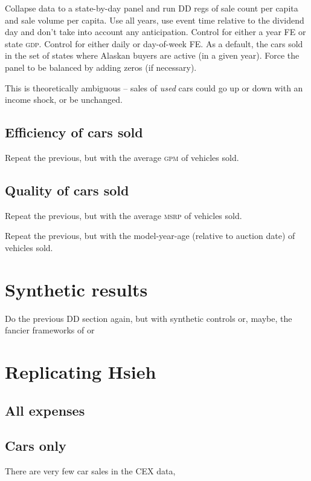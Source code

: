 \documentclass[11pt,letterpaper,oneside]{article}
\newcommand{\gpm}{\textsc{gpm}}
\newcommand{\msrp}{\textsc{msrp}}
\newcommand{\gdp}{\textsc{gdp}}
\begin{document}
Collapse data to a state-by-day panel and run DD regs of sale count per capita and sale volume per capita.
Use all years, use event time relative to the dividend day and don't take into account any anticipation.
Control for either a year FE or state \gdp{}. Control for either daily or day-of-week FE.
As a default, the cars sold in the set of states where Alaskan buyers are active (in a given year).
Force the panel to be balanced by adding zeros (if necessary).

This is theoretically ambiguous -- sales of \emph{used} cars could go up or down with an income shock, or be unchanged.

\subsection{Efficiency of cars sold}
Repeat the previous, but with the average \gpm{} of vehicles sold.

\subsection{Quality of cars sold}
Repeat the previous, but with the average \msrp{} of vehicles sold.

Repeat the previous, but with the model-year-age (relative to auction date) of vehicles sold.


\section{Synthetic results}
Do the previous DD section again, but with synthetic controls or, maybe, the fancier frameworks of
\textcite{DoudchenkoImbens2016DD} or \textcite{Xu2016}




\section{Replicating Hsieh}

\subsection{All expenses}
\subsection{Cars only}

There are very few car sales in the CEX data,
\end{document}
